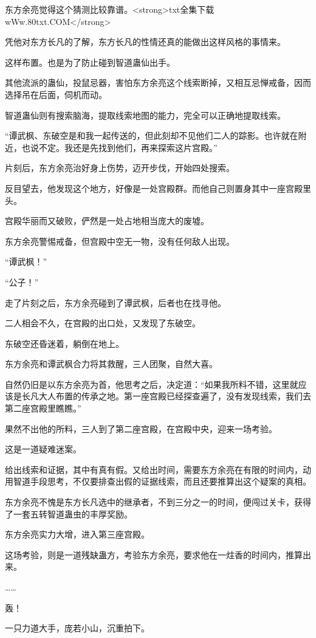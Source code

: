 \begin{this_body}
东方余亮觉得这个猜测比较靠谱。<strong>txt全集下载wWw.80txt.COM</strong>

凭他对东方长凡的了解，东方长凡的性情还真的能做出这样风格的事情来。

这样布置。也是为了防止碰到智道蛊仙出手。

其他流派的蛊仙，投鼠忌器，害怕东方余亮这个线索断掉，又相互忌惮戒备，因而选择吊在后面，伺机而动。

智道蛊仙则有搜索脑海，提取线索地图的能力，完全可以正确地提取线索。

“谭武枫、东破空是和我一起传送的，但此刻却不见他们二人的踪影。也许就在附近，也说不定。我还是先找到他们，再来探索这片宫殿。”

片刻后，东方余亮治好身上伤势，迈开步伐，开始四处搜索。

反目望去，他发现这个地方，好像是一处宫殿群。而他自己则置身其中一座宫殿里头。

宫殿华丽而又破败，俨然是一处占地相当庞大的废墟。

东方余亮警惕戒备，但宫殿中空无一物，没有任何敌人出现。

“谭武枫！”

“公子！”

走了片刻之后，东方余亮碰到了谭武枫，后者也在找寻他。

二人相会不久，在宫殿的出口处，又发现了东破空。

东破空还昏迷着，躺倒在地上。

东方余亮和谭武枫合力将其救醒，三人团聚，自然大喜。

自然仍旧是以东方余亮为首，他思考之后，决定道：“如果我所料不错，这里就应该是长凡大人布置的传承之地。第一座宫殿已经探查遍了，没有发现线索，我们去第二座宫殿里瞧瞧。”

果然不出他的所料，三人到了第二座宫殿，在宫殿中央，迎来一场考验。

这是一道疑难迷案。

给出线索和证据，其中有真有假。又给出时间，需要东方余亮在有限的时间内，动用智道手段思考，不仅要排查出假的证据线索，而且还要推算出这个疑案的真相。

东方余亮不愧是东方长凡选中的继承者，不到三分之一的时间，便闯过关卡，获得了一套五转智道蛊虫的丰厚奖励。

东方余亮实力大增，进入第三座宫殿。

这场考验，则是一道残缺蛊方，考验东方余亮，要求他在一炷香的时间内，推算出来。

……

轰！

一只力道大手，庞若小山，沉重拍下。


\end{this_body}
